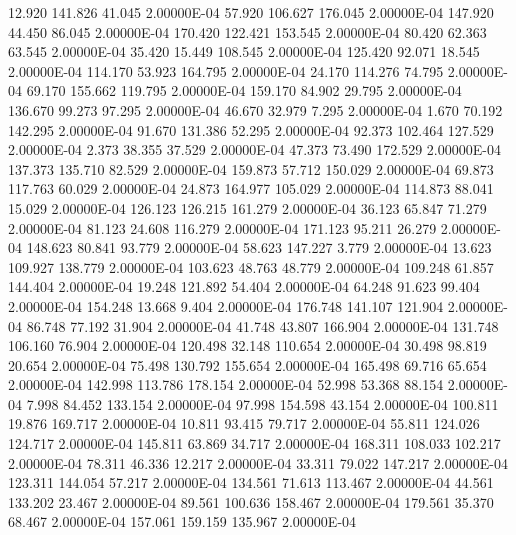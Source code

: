     12.920   141.826    41.045  2.00000E-04
    57.920   106.627   176.045  2.00000E-04
   147.920    44.450    86.045  2.00000E-04
   170.420   122.421   153.545  2.00000E-04
    80.420    62.363    63.545  2.00000E-04
    35.420    15.449   108.545  2.00000E-04
   125.420    92.071    18.545  2.00000E-04
   114.170    53.923   164.795  2.00000E-04
    24.170   114.276    74.795  2.00000E-04
    69.170   155.662   119.795  2.00000E-04
   159.170    84.902    29.795  2.00000E-04
   136.670    99.273    97.295  2.00000E-04
    46.670    32.979     7.295  2.00000E-04
     1.670    70.192   142.295  2.00000E-04
    91.670   131.386    52.295  2.00000E-04
    92.373   102.464   127.529  2.00000E-04
     2.373    38.355    37.529  2.00000E-04
    47.373    73.490   172.529  2.00000E-04
   137.373   135.710    82.529  2.00000E-04
   159.873    57.712   150.029  2.00000E-04
    69.873   117.763    60.029  2.00000E-04
    24.873   164.977   105.029  2.00000E-04
   114.873    88.041    15.029  2.00000E-04
   126.123   126.215   161.279  2.00000E-04
    36.123    65.847    71.279  2.00000E-04
    81.123    24.608   116.279  2.00000E-04
   171.123    95.211    26.279  2.00000E-04
   148.623    80.841    93.779  2.00000E-04
    58.623   147.227     3.779  2.00000E-04
    13.623   109.927   138.779  2.00000E-04
   103.623    48.763    48.779  2.00000E-04
   109.248    61.857   144.404  2.00000E-04
    19.248   121.892    54.404  2.00000E-04
    64.248    91.623    99.404  2.00000E-04
   154.248    13.668     9.404  2.00000E-04
   176.748   141.107   121.904  2.00000E-04
    86.748    77.192    31.904  2.00000E-04
    41.748    43.807   166.904  2.00000E-04
   131.748   106.160    76.904  2.00000E-04
   120.498    32.148   110.654  2.00000E-04
    30.498    98.819    20.654  2.00000E-04
    75.498   130.792   155.654  2.00000E-04
   165.498    69.716    65.654  2.00000E-04
   142.998   113.786   178.154  2.00000E-04
    52.998    53.368    88.154  2.00000E-04
     7.998    84.452   133.154  2.00000E-04
    97.998   154.598    43.154  2.00000E-04
   100.811    19.876   169.717  2.00000E-04
    10.811    93.415    79.717  2.00000E-04
    55.811   124.026   124.717  2.00000E-04
   145.811    63.869    34.717  2.00000E-04
   168.311   108.033   102.217  2.00000E-04
    78.311    46.336    12.217  2.00000E-04
    33.311    79.022   147.217  2.00000E-04
   123.311   144.054    57.217  2.00000E-04
   134.561    71.613   113.467  2.00000E-04
    44.561   133.202    23.467  2.00000E-04
    89.561   100.636   158.467  2.00000E-04
   179.561    35.370    68.467  2.00000E-04
   157.061   159.159   135.967  2.00000E-04
